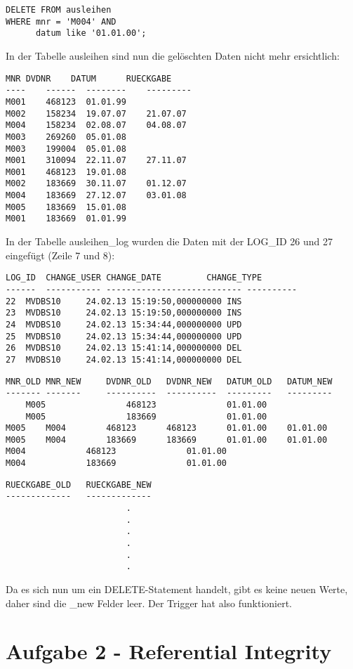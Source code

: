 \documentclass[11pt,a4paper,parskip=half]{scrartcl}
\begin{document}
\begin{lstlisting}
DELETE FROM ausleihen
WHERE mnr = 'M004' AND
      datum like '01.01.00';
\end{lstlisting}

In der Tabelle ausleihen sind nun die gelöschten Daten nicht mehr ersichtlich:

\begin{lstlisting}
MNR	DVDNR	 DATUM		RUECKGABE
---- 	------	-------- 	---------
M001	468123 	01.01.99	
M002	158234 	19.07.07	21.07.07  
M004	158234 	02.08.07	04.08.07  
M003	269260 	05.01.08	
M003	199004 	05.01.08	
M001	310094 	22.11.07	27.11.07  
M001	468123 	19.01.08	
M002	183669 	30.11.07	01.12.07  
M004	183669 	27.12.07	03.01.08  
M005	183669 	15.01.08	
M001	183669 	01.01.99	
\end{lstlisting}

In der Tabelle ausleihen\_log wurden die Daten mit der LOG\_ID 26 und 27 eingefügt (Zeile 7 und 8):

\begin{lstlisting}
LOG_ID	CHANGE_USER	CHANGE_DATE			CHANGE_TYPE	
------	-----------	---------------------------	----------		
22	MVDBS10		24.02.13 15:19:50,000000000	INS					
23	MVDBS10		24.02.13 15:19:50,000000000	INS					
24	MVDBS10		24.02.13 15:34:44,000000000	UPD					
25	MVDBS10		24.02.13 15:34:44,000000000	UPD					
26	MVDBS10		24.02.13 15:41:14,000000000	DEL					
27	MVDBS10		24.02.13 15:41:14,000000000	DEL					
\end{lstlisting}

\begin{lstlisting}
MNR_OLD	MNR_NEW		DVDNR_OLD	DVDNR_NEW	DATUM_OLD	DATUM_NEW	
-------	-------		----------	----------	---------	--------- 	
	M005				468123				01.01.00					
	M005				183669				01.01.00					
M005	M004		468123		468123		01.01.00	01.01.00				
M005	M004		183669		183669		01.01.00	01.01.00				
M004			468123				01.01.00					
M004			183669				01.01.00					
\end{lstlisting}
\begin{lstlisting}
RUECKGABE_OLD	RUECKGABE_NEW
-------------	-------------	
						.
						.
						.
						.
						.
						.
\end{lstlisting}

Da es sich nun um ein DELETE-Statement handelt, gibt es keine neuen Werte, daher sind die \_new Felder leer. Der Trigger hat also funktioniert.

\section{Aufgabe 2 - Referential Integrity}
\end{document}
